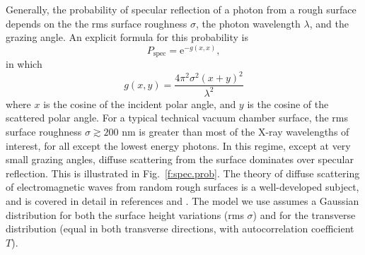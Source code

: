 Generally, the probability of specular reflection of a photon from a
rough surface depends on the the rms surface roughness $\sigma$, the
photon wavelength $\lambda$, and the grazing angle. An explicit
formula for this probability is~\cite{b:beckmann}
   \begin{equation}
P_{\textrm{spec}}=\textrm{e}^{-g(x,x)},
\end{equation}
in which
   \begin{equation}
g(x,y)=\frac{4\pi^{2}\sigma^{2}(x+y)^{2}}{\lambda^{2}}
  \end{equation}
where $x$ is the cosine of the incident polar angle, and $y$ is the
cosine of the scattered polar angle. For a typical technical vacuum
chamber surface, the rms surface roughness $\sigma \gtrsim 200$ nm is
greater than most of the X-ray wavelengths of interest, for all except
the lowest energy photons. In this regime, except at very small
grazing angles, diffuse scattering from the surface dominates over
specular reflection. This is illustrated in Fig.~\ref{f:spec.prob}.
The theory of diffuse scattering of electromagnetic waves from random
rough surfaces is a well-developed subject, and is covered in detail
in references \cite{b:beckmann} and \cite{b:ogilvy}. The model we use
assumes a Gaussian distribution for both the surface height variations
(rms $\sigma$) and for the transverse distribution (equal in both
transverse directions, with autocorrelation coefficient $T$).

